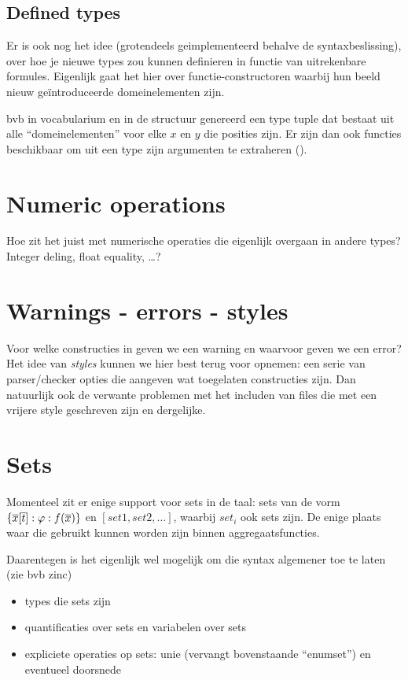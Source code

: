\documentclass{article}
\begin{document}
\subsection{Defined types}
Er is ook nog het idee (grotendeels geimplementeerd behalve de syntaxbeslissing), over hoe je nieuwe types zou kunnen definieren in functie van uitrekenbare formules. Eigenlijk gaat het hier over functie-constructoren waarbij hun beeld nieuw geïntroduceerde domeinelementen zijn.

bvb  in vocabularium en  in de structuur genereerd een type tuple dat bestaat uit alle ``domeinelementen''  voor elke $x$ en $y$ die posities zijn. Er zijn dan ook functies beschikbaar om uit een type zijn argumenten te extraheren ().



\section{Numeric operations}
Hoe zit het juist met numerische operaties die eigenlijk overgaan in andere types? Integer deling, float equality, \ldots?



\section{Warnings - errors - styles}
Voor welke constructies in \foidp geven we een warning en waarvoor geven we een error? Het idee van \emph{styles} kunnen we hier best terug voor opnemen: een serie van parser/checker opties die aangeven wat toegelaten constructies zijn. Dan natuurlijk ook de verwante problemen met het includen van files die met een vrijere style geschreven zijn en dergelijke.



\section{Sets}
Momenteel zit er enige support voor sets in de taal: sets van de vorm $\{\overline{x}[\overline{t}]: \varphi : f(\overline{x})\}$ en $[set1, set2, \ldots]$, waarbij $set_i$ ook sets zijn. De enige plaats waar die gebruikt kunnen worden zijn binnen aggregaatsfuncties.

Daarentegen is het eigenlijk wel mogelijk om die syntax algemener toe te laten (zie bvb zinc)
\begin{itemize}
  \item types die sets zijn
  \item quantificaties over sets en variabelen over sets
  \item expliciete operaties op sets: unie (vervangt bovenstaande ``enumset'') en eventueel doorsnede
\end{itemize}
\end{document}
